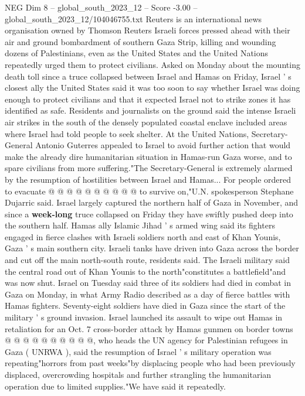 \begin{textsample}{NEG Dim 8 – global\_south\_2023\_12 – Score -3.00 – global\_south\_2023\_12/104046755.txt}  \label{ex:f8_neg_008}
Reuters is an international news organisation owned by Thomson Reuters Israeli forces pressed ahead with their air and ground bombardment of southern Gaza Strip, killing and wounding dozens of Palestinians, even as the United States and the United Nations repeatedly urged them to protect civilians.
Asked on Monday about the mounting death toll since a truce collapsed between Israel and Hamas on Friday, Israel ' s closest ally the United States said it was too soon to say whether Israel was doing enough to protect civilians and that it expected Israel not to strike zones it has identified as safe.
Residents and journalists on the ground said the intense Israeli air strikes in the south of the densely populated coastal enclave included areas where Israel had told people to seek shelter.
At the United Nations, Secretary-General Antonio Guterres appealed to Israel to avoid further action that would make the already dire humanitarian situation in Hamas-run Gaza worse, and to spare civilians from more suffering."The Secretary-General is extremely alarmed by the resumption of hostilities between Israel and Hamas...
For people ordered to evacuate @ @ @ @ @ @ @ @ @ @ to survive on,"U.N. spokesperson Stephane Dujarric said.
Israel largely captured the northern half of Gaza in November, and since a \textbf{week-long} truce collapsed on Friday they have swiftly pushed deep into the southern half.
Hamas ally Islamic Jihad ' s armed wing said its fighters engaged in fierce clashes with Israeli soldiers north and east of Khan Younis, Gaza ' s main southern city.
Israeli tanks have driven into Gaza across the border and cut off the main north-south route, residents said.
The Israeli military said the central road out of Khan Younis to the north"constitutes a battlefield"and was now shut.
Israel on Tuesday said three of its soldiers had died in combat in Gaza on Monday, in what Army Radio described as a day of fierce battles with Hamas fighters.
Seventy-eight soldiers have died in Gaza since the start of the military ' s ground invasion.
Israel launched its assault to wipe out Hamas in retaliation for an Oct. 7 cross-border attack by Hamas gunmen on border towns @ @ @ @ @ @ @ @ @ @, who heads the UN agency for Palestinian refugees in Gaza ( UNRWA ), said the resumption of Israel ' s military operation was repeating"horrors from past weeks"by displacing people who had been previously displaced, overcrowding hospitals and further strangling the humanitarian operation due to limited supplies."We have said it repeatedly.

\end{textsample}
